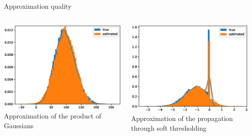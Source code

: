 \documentclass[9pt]{beamer}
\begin{document}
\begin{frame}{Approximation quality}
    \begin{columns}
      \begin{column}{0.5\textwidth}
       \centering
       \includegraphics[width=\columnwidth]{graphics/d_testing}\\
       Approximation of the \newline product of Gaussians
      \end{column}
            \begin{column}{0.5\textwidth}
      \centering
      \includegraphics[width=\columnwidth]{graphics/z_new_testing}\\
      Approximation of the propagation through soft thresholding
      \end{column}
      \end{columns}

\end{frame}
\end{document}
